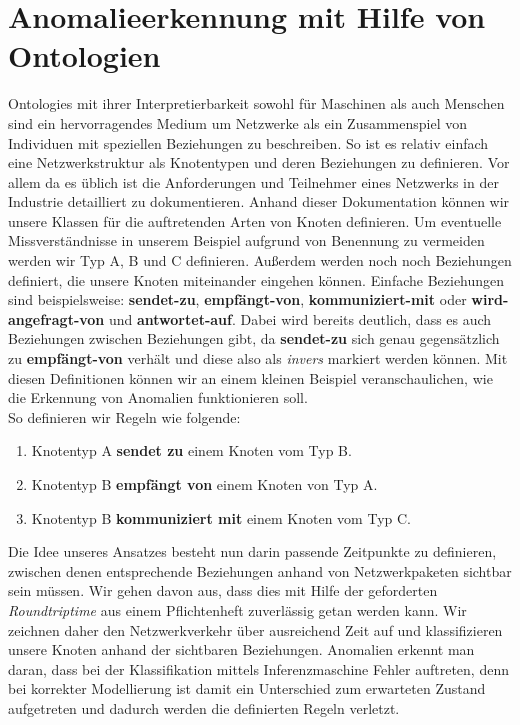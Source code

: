 \section{\nohyphens{Anomalieerkennung mit Hilfe von Ontologien}}
\Glspl{Ontologie} mit ihrer Interpretierbarkeit sowohl für Maschinen als auch Menschen sind ein hervorragendes Medium um Netzwerke als ein Zusammenspiel von Individuen mit speziellen Beziehungen zu beschreiben. So ist es relativ einfach eine Netzwerkstruktur als Knotentypen und deren Beziehungen zu definieren. Vor allem da es üblich ist die Anforderungen und Teilnehmer eines Netzwerks in der Industrie detailliert zu dokumentieren. Anhand dieser Dokumentation können wir unsere Klassen für die auftretenden Arten von Knoten definieren. Um eventuelle Missverständnisse in unserem Beispiel aufgrund von Benennung zu vermeiden werden wir Typ A, B und C definieren. Außerdem werden noch noch Beziehungen definiert, die unsere Knoten miteinander eingehen können. Einfache Beziehungen sind beispielsweise: \textbf{sendet-zu}, \textbf{empfängt-von}, \textbf{kommuniziert-mit} oder \textbf{wird-angefragt-von} und \textbf{antwortet-auf}. Dabei wird bereits deutlich, dass es auch Beziehungen zwischen Beziehungen gibt, da \textbf{sendet-zu} sich genau gegensätzlich zu \textbf{empfängt-von} verhält und diese also als  \textit{invers} markiert werden können. Mit diesen Definitionen können wir an einem kleinen Beispiel veranschaulichen, wie die Erkennung von Anomalien funktionieren soll.\\
So definieren wir Regeln wie folgende:
\begin{center}
\end{center}
\begin{enumerate}
\item Knotentyp A \textbf{sendet zu} einem Knoten vom Typ B.
\item Knotentyp B \textbf{empfängt von} einem Knoten von Typ A.
\item Knotentyp B \textbf{kommuniziert mit} einem Knoten vom Typ C.
\end{enumerate}
Die Idee unseres Ansatzes besteht nun darin passende Zeitpunkte zu definieren, zwischen denen entsprechende Beziehungen anhand von Netzwerkpaketen sichtbar sein müssen. Wir gehen davon aus, dass dies mit Hilfe der geforderten \textit{\Gls{Roundtriptime}} aus einem Pflichtenheft zuverlässig getan werden kann. Wir zeichnen daher den Netzwerkverkehr über ausreichend Zeit auf und klassifizieren unsere Knoten anhand der sichtbaren Beziehungen. Anomalien erkennt man daran, dass bei der Klassifikation mittels Inferenzmaschine Fehler auftreten, denn bei korrekter Modellierung ist damit ein Unterschied zum erwarteten Zustand aufgetreten und dadurch werden die definierten Regeln verletzt.

